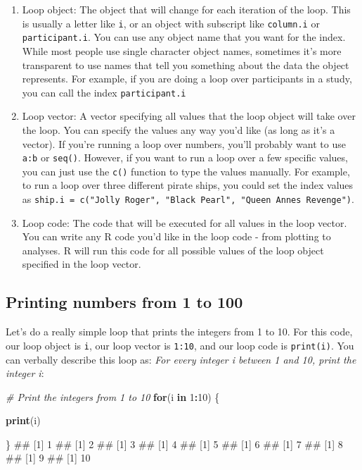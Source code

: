 \documentclass[]{book}
\newenvironment{Shaded}{\begin{snugshade}}{\end{snugshade}}
\newcommand{\KeywordTok}[1]{\textcolor[rgb]{0.13,0.29,0.53}{\textbf{#1}}}
\newcommand{\DecValTok}[1]{\textcolor[rgb]{0.00,0.00,0.81}{#1}}
\newcommand{\CommentTok}[1]{\textcolor[rgb]{0.56,0.35,0.01}{\textit{#1}}}
\newcommand{\ControlFlowTok}[1]{\textcolor[rgb]{0.13,0.29,0.53}{\textbf{#1}}}
\newcommand{\OperatorTok}[1]{\textcolor[rgb]{0.81,0.36,0.00}{\textbf{#1}}}
\newcommand{\NormalTok}[1]{#1}
\theoremstyle{definition}
\theoremstyle{definition}
\theoremstyle{remark}
\begin{document}
\begin{enumerate}
\def\labelenumi{\arabic{enumi}.}
\item
  Loop object: The object that will change for each iteration of the
  loop. This is usually a letter like \texttt{i}, or an object with
  subscript like \texttt{column.i} or \texttt{participant.i}. You can
  use any object name that you want for the index. While most people use
  single character object names, sometimes it's more transparent to use
  names that tell you something about the data the object represents.
  For example, if you are doing a loop over participants in a study, you
  can call the index \texttt{participant.i}
\item
  Loop vector: A vector specifying all values that the loop object will
  take over the loop. You can specify the values any way you'd like (as
  long as it's a vector). If you're running a loop over numbers, you'll
  probably want to use \texttt{a:b} or \texttt{seq()}. However, if you
  want to run a loop over a few specific values, you can just use the
  \texttt{c()} function to type the values manually. For example, to run
  a loop over three different pirate ships, you could set the index
  values as
  \texttt{ship.i\ =\ c("Jolly\ Roger",\ "Black\ Pearl",\ "Queen\ Anne\textquotesingle{}s\ Revenge")}.
\item
  Loop code: The code that will be executed for all values in the loop
  vector. You can write any R code you'd like in the loop code - from
  plotting to analyses. R will run this code for all possible values of
  the loop object specified in the loop vector.
\end{enumerate}

\subsection{Printing numbers from 1 to
100}\label{printing-numbers-from-1-to-100}

Let's do a really simple loop that prints the integers from 1 to 10. For
this code, our loop object is \texttt{i}, our loop vector is
\texttt{1:10}, and our loop code is \texttt{print(i)}. You can verbally
describe this loop as: \emph{For every integer i between 1 and 10, print
the integer i}:

\begin{Shaded}
\begin{Highlighting}[]
\CommentTok{# Print the integers from 1 to 10}
\ControlFlowTok{for}\NormalTok{(i }\ControlFlowTok{in} \DecValTok{1}\OperatorTok{:}\DecValTok{10}\NormalTok{) \{}
  
  \KeywordTok{print}\NormalTok{(i)}
  
\NormalTok{\}}
\NormalTok{## [1] 1}
\NormalTok{## [1] 2}
\NormalTok{## [1] 3}
\NormalTok{## [1] 4}
\NormalTok{## [1] 5}
\NormalTok{## [1] 6}
\NormalTok{## [1] 7}
\NormalTok{## [1] 8}
\NormalTok{## [1] 9}
\NormalTok{## [1] 10}
\end{Highlighting}
\end{Shaded}
\end{document}
